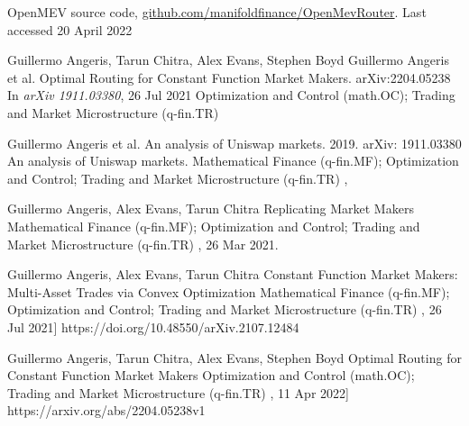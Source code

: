 \documentclass[runningheads]{llncs}
\begin{document}
\newpage
%
%
%
% 
% 
%
\begin{thebibliography}{1}
OpenMEV source code, \url{github.com/manifoldfinance/OpenMevRouter}.
Last accessed 20 April 2022
	
\newline 
{}
Guillermo Angeris, Tarun Chitra, Alex Evans, Stephen Boyd
\newblock Guillermo Angeris et al. Optimal Routing for Constant Function Market Makers.	arXiv:2204.05238
\newblock In {\em arXiv 1911.03380}, 26 Jul 2021
    Optimization and Control (math.OC); Trading and Market Microstructure (q-fin.TR)

\hfill \break
{}
Guillermo Angeris et al. An analysis of Uniswap markets. 2019. arXiv: 1911.03380
\newblock An analysis of Uniswap markets.
Mathematical Finance (q-fin.MF); Optimization and Control; Trading and Market Microstructure (q-fin.TR)
, 

\hfill \break
{}
Guillermo Angeris, Alex Evans, Tarun Chitra
\newblock Replicating Market Makers
Mathematical Finance (q-fin.MF); Optimization and Control; Trading and Market Microstructure (q-fin.TR)
, 26 Mar 2021.

\hfill \break
{}
Guillermo Angeris, Alex Evans, Tarun Chitra
\newblock Constant Function Market Makers: Multi-Asset Trades via Convex Optimization
Mathematical Finance (q-fin.MF); Optimization and Control; Trading and Market Microstructure (q-fin.TR)
, 26 Jul 2021]
https://doi.org/10.48550/arXiv.2107.12484

\hfill \break
{}
Guillermo Angeris, Tarun Chitra, Alex Evans, Stephen Boyd
\newblock Optimal Routing for Constant Function Market Makers
Optimization and Control (math.OC); Trading and Market Microstructure (q-fin.TR)
, 11 Apr 2022]
https://arxiv.org/abs/2204.05238v1
\hfill \break

\end{thebibliography}
\end{document}
